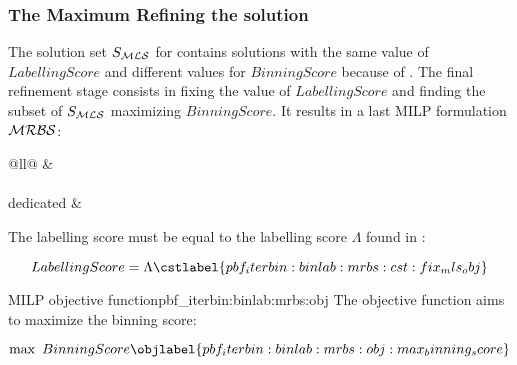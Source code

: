 \subsubsection{The Maximum Refining the \MLS{} solution}\label{sec:pbf_iterbin:binlab:mrbs}

The solution set \(S_{\mathcal{MLS}}{}\) for \MLS{} contains solutions with the same value of \(LabellingScore\) and different values for \(BinningScore\) because of .
The final refinement stage consists in fixing the value of \(LabellingScore\) and finding the subset of \(S_{\mathcal{MLS}}{}\) maximizing \(BinningScore\).
It results in a last MILP formulation \(\mathcal{MRBS}{}\):

\begin{table}[h!]
  \centering
  \label{tab:binlab:mrbs:cst}
  \begin{tabular}{@{}ll@{}}
    \toprule
     &  \\
    \midrule
     \\
    \addlinespace
    \MRBS{} dedicated &  \\
    \bottomrule
  \end{tabular}
\end{table}

The labelling score must be equal to the labelling score \(\Lambda{}\) found in \MLS{}:
\begin{Constraint}
  \begin{equation}
    LabellingScore = \Lambda
    \cstlabel{pbf_iterbin:binlab:mrbs:cst:fix_mls_obj} %
  \end{equation}
\end{Constraint}

\begin{definition}{\MRBS{} MILP objective function}{pbf_iterbin:binlab:mrbs:obj}
  The objective function aims to maximize the binning score:
  \begin{Objective}
    \begin{equation}
      \max ~ BinningScore
      \objlabel{pbf_iterbin:binlab:mrbs:obj:max_binning_score} %
    \end{equation}
  \end{Objective}
\end{definition}
